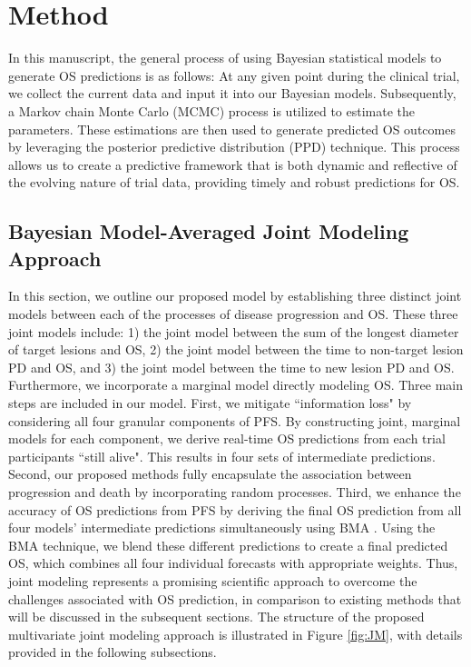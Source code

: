 \section{Method}
\label{sec:method}
In this manuscript, the general process of using Bayesian statistical models to generate \ac{OS} predictions is as follows: At any given point during the clinical trial, we collect the current data and input it into our Bayesian models. Subsequently, a Markov chain Monte Carlo (MCMC) process is utilized to estimate the parameters. These estimations are then used to generate predicted \ac{OS} outcomes by leveraging the posterior predictive distribution (PPD) technique. This process allows us to create a predictive framework that is both dynamic and reflective of the evolving nature of trial data, providing timely and robust predictions for OS.


\subsection{Bayesian Model-Averaged Joint Modeling Approach}
\label{sec:jm}

In this section, we outline our proposed model by establishing three distinct joint models between each of the processes of disease progression and OS. These three joint models include: 1) the joint model between the sum of the longest diameter of target lesions and OS, 2) the joint model between the time to non-target lesion \ac{PD} and OS, and 3) the joint model between the time to new lesion \ac{PD} and OS. Furthermore, we incorporate a marginal model directly modeling OS. Three main steps are included in our model. First, we mitigate ``information loss" by considering all four granular components of PFS. By constructing joint, marginal models for each component, we derive real-time \ac{OS} predictions from each trial participants ``still alive". This results in four sets of intermediate predictions. Second, our proposed methods fully encapsulate the association between progression and death by incorporating random processes. Third, we enhance the accuracy of \ac{OS} predictions from \ac{PFS} by deriving the final \ac{OS} prediction from all four models' intermediate predictions simultaneously using \ac{BMA} \citep{hoeting1999bayesian}. Using the \ac{BMA} technique, we blend these different predictions to create a final predicted OS, which combines all four individual forecasts with appropriate weights. Thus, joint modeling represents a promising scientific approach to overcome the challenges associated with \ac{OS} prediction, in comparison to existing methods that will be discussed in the subsequent sections. The structure of the proposed multivariate joint modeling approach is illustrated in Figure \ref{fig:JM}, with details provided in the following subsections.
